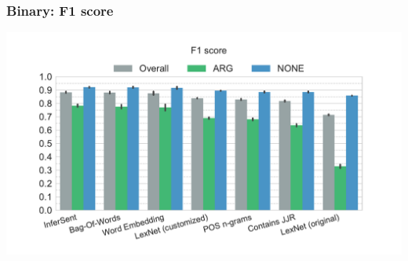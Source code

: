 \documentclass[11pt,aspectratio=169]{beamer}
\begin{document}
    \begin{frame}
        \frametitle{Binary: F1 score}
        \centerline{\includegraphics[scale=0.45,trim={0 0 0 0.5cm},clip]{images/experiments/p-f1-True}}
    \end{frame}
\end{document}
